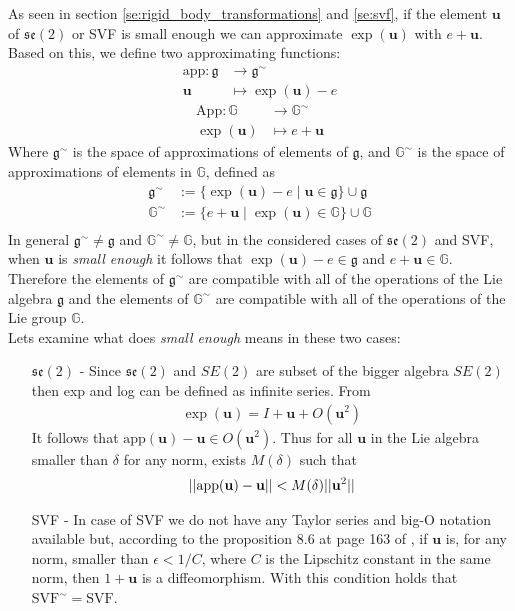 \noindent
As seen in section \ref{se:rigid_body_transformations} and \ref{se:svf}, if the element $\mathbf{u}$ of $\mathfrak{se}(2)$ or SVF is small enough we can approximate $\exp(\mathbf{u})$ with $e + \mathbf{u}$. Based on this, we define two approximating functions:
\begin{align*}
\text{app} : \mathfrak{g} & \longrightarrow  \mathfrak{g}^{\sim}    \\
\mathbf{u} &\longmapsto \exp(\mathbf{u}) - e
\end{align*}
\begin{align*}
\text{App} : \mathbb{G} & \longrightarrow  \mathbb{G}^{\sim}   \\
\exp(\mathbf{u}) &\longmapsto e + \mathbf{u}
\end{align*}
Where $\mathfrak{g} ^{\sim}$ is the space of approximations of elements of $\mathfrak{g} $, and $\mathbb{G}^{\sim} $ is the space of approximations of elements in $\mathbb{G}$, defined as
\begin{align*}
\mathfrak{g} ^{\sim} & := \{ \exp(\mathbf{u}) - e \mid \mathbf{u}\in \mathfrak{g}\} \cup \mathfrak{g} \\
\mathbb{G}^{\sim}  & := \{ e + \mathbf{u} \mid \exp(\mathbf{u})\in \mathbb{G}\} \cup \mathbb{G} \\
\end{align*}
In general $\mathfrak{g}^{\sim} \neq \mathfrak{g}$ and $\mathbb{G}^{\sim} \neq \mathbb{G}$, but in the considered cases of $\mathfrak{se}(2)$ and SVF, when $\mathbf{u}$ is \emph{small enough}
it follows that $\exp(\mathbf{u}) - e \in \mathfrak{g} $ and $e + \mathbf{u}\in \mathbb{G}$. Therefore the elements of $\mathfrak{g}^{\sim} $ are compatible with all of the operations of the Lie algebra $\mathfrak{g}$ and the elements of $\mathbb{G}^{\sim}$ are compatible with all of the operations of the Lie group $\mathbb{G}$.\\
Lets examine what does \emph{small enough} means in these two cases:
\begin{enumerate}
	\item[$\mathfrak{se}(2)$ -] Since $\mathfrak{se}(2)$ and $SE(2)$ are subset of the bigger algebra $SE(2)$ then exp and log can be defined as infinite series. From 
	\begin{align*}
	\exp(\mathbf{u}) = I + \mathbf{u} + O(\mathbf{u}^2) 
	\end{align*}
	It follows that $\text{app}(\mathbf{u}) - \mathbf{u} \in O(\mathbf{u}^2)$. Thus for all $\mathbf{u}$ in the Lie algebra smaller than $\delta$ for any norm, exists $M(\delta)$ such that
	\begin{align*}
	\vert\lvert \text{app}(\mathbf{u}) - \mathbf{u}  \rvert\vert < M(\delta) \vert\lvert \mathbf{u}^2 \rvert\vert
	\end{align*}
	\item[SVF -] In case of SVF we do not have any Taylor series and big-O notation available but, according to the proposition 8.6 at page 163 of \cite{younes2010shapes}, if $\mathbf{u}$ is, for any norm, smaller than $\epsilon<1/C$, where $C$ is the Lipschitz constant in the same norm, then $1 + \mathbf{u}$ is a diffeomorphism. With this condition holds that
	$\text{SVF}^{\sim} = \text{SVF}$. 
\end{enumerate}

